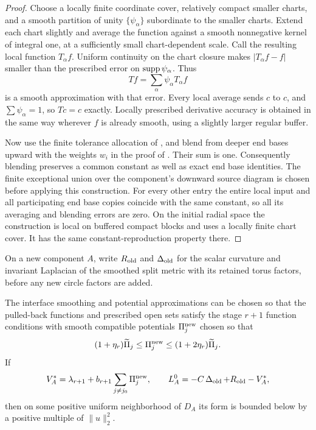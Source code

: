 \begin{proof}
Choose a locally finite coordinate cover, relatively compact smaller
charts, and a smooth partition of unity $\{\psi_\alpha\}$ subordinate
to the smaller charts.  Extend each chart slightly and average the
function against a smooth nonnegative kernel of integral one, at a
sufficiently small chart-dependent scale.  Call the resulting local
function $T_\alpha f$.  Uniform continuity on the chart closure makes
$|T_\alpha f-f|$ smaller than the prescribed error on
$\operatorname{supp}\psi_\alpha$.  Thus
\[
                    Tf=\sum_\alpha\psi_\alpha T_\alpha f
\]
is a smooth approximation with that error.  Every local average sends
$c$ to $c$, and $\sum\psi_\alpha=1$, so $Tc=c$ exactly.  Locally
prescribed derivative accuracy is obtained in the same way wherever
$f$ is already smooth, using a slightly larger regular buffer.

Now use the finite tolerance allocation of
, and blend from deeper end bases upward with
the weights $w_i$ in the proof of .  Their sum
is one.  Consequently blending preserves a common constant as well as
exact end base identities. The finite exceptional union over the component's
downward source diagram is chosen before applying this construction.
For every other entry the entire local input and all participating end base
copies coincide with the same constant, so all its averaging and
blending errors are zero.  On the initial radial space the construction is
local on buffered compact blocks and uses a locally finite chart cover.
It has the same constant-reproduction property there.
\end{proof}

On a new component $A$, write $R_{\rm old}$ and $\operatorname{\Delta}_{\rm old}$ for the
scalar curvature and invariant Laplacian of the smoothed split metric
with its retained torus factors, before any new circle factors are added.

\begin{lemma}\label{regular:functions}
The interface smoothing and potential approximations can be chosen so
that the pulled-back functions and prescribed open sets satisfy the stage $r+1$
function conditions with smooth compatible potentials
$\Pi_j^{\rm new}$ chosen so that
\[
 (1+\eta_r)\widetilde\Pi_j
 \le\Pi_j^{\rm new}\le(1+2\eta_r)\widetilde\Pi_j.
\]
If
\begin{equation}\label{regular:Vstar}
 V_A^*=\lambda_{r+1}+b_{r+1}\sum_{j\ne j_0}\Pi_j^{\rm new},\qquad
 L_A^0=-C\operatorname{\Delta}_{\rm old}+R_{\rm old}-V_A^*,
\end{equation}
then on some positive uniform neighborhood of $D_A$ its form is bounded
below by a positive multiple of $\|u\|_2^2$.
\end{lemma}

